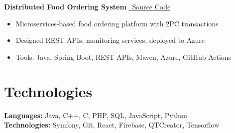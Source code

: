 \documentclass[10pt,a4paper]{article}
\newenvironment{highlights}{\begin{itemize}}{\end{itemize}}
\begin{document}
\textbf{Distributed Food Ordering System} \hfill \href{https://github.com/Yornared/Food-ordering-webshop}{\faGithub\ Source Code}  
\begin{highlights}
    \item Microservices-based food ordering platform with 2PC transactions
    \item Designed REST APIs, monitoring services, deployed to Azure
    \item Tools: Java, Spring Boot, REST APIs, Maven, Azure, GitHub Actions
\end{highlights}

\section{Technologies}
\textbf{Languages:} Java, C++, C, PHP, SQL, JavaScript, Python\\
\textbf{Technologies:} Symfony, Git, React, Firebase, QTCreator, Tensorflow
\end{document}
